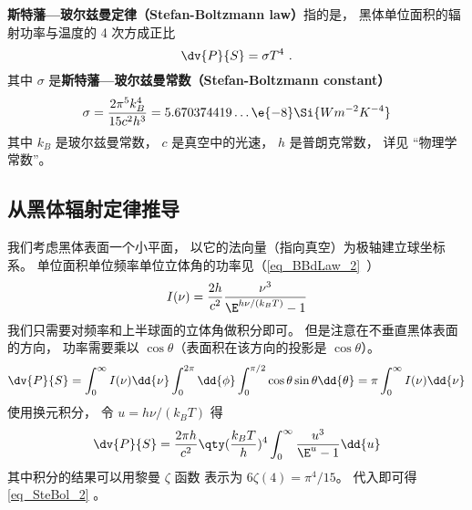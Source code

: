 
\textbf{斯特藩—玻尔兹曼定律（Stefan-Boltzmann law）}指的是， 黑体单位面积的辐射功率与温度的 4 次方成正比
\begin{equation}\label{eq_SteBol_2}
\dv{P}{S} = \sigma T^4~.
\end{equation}
其中 $\sigma$ 是\textbf{斯特藩—玻尔兹曼常数（Stefan-Boltzmann constant）}
\begin{equation}
\sigma = \frac{2\pi^5k_B^4}{15c^2h^3} = 5.670374419\dots \e{-8} \Si{Wm^{-2}K^{-4}}
\end{equation}
其中 $k_B$ 是玻尔兹曼常数， $c$ 是真空中的光速， $h$ 是普朗克常数， 详见 “物理学常数”。

\subsection{从黑体辐射定律推导}

我们考虑黑体表面一个小平面， 以它的法向量（指向真空）为极轴建立球坐标系。 单位面积单位频率单位立体角的功率见（\autoref{eq_BBdLaw_2}~）
\begin{equation}\label{eq_SteBol_1}
I(\nu) = \frac{2h}{c^2} \frac{\nu^3}{\E^{h\nu/(k_B T)} - 1}
\end{equation}
我们只需要对频率和上半球面的立体角做积分即可。 但是注意在不垂直黑体表面的方向， 功率需要乘以 $\cos\theta$（表面积在该方向的投影是 $\cos\theta$）。
\begin{equation}
\dv{P}{S} = \int_0^\infty I(\nu) \dd{\nu} \int_0^{2\pi} \dd{\phi} \int_0^{\pi/2}\cos\theta\sin\theta\dd{\theta}
= \pi \int_0^\infty I(\nu) \dd{\nu}
\end{equation}
使用换元积分， 令 $u = h\nu/(k_BT)$ 得
\begin{equation}
\dv{P}{S} = \frac{2\pi h}{c^2} \qty(\frac{k_B T}{h})^4 \int_0^\infty \frac{u^3}{\E^u - 1}\dd{u}
\end{equation}
其中积分的结果可以用黎曼 $\zeta$ 函数%
表示为 $6\zeta(4) = \pi^4/15$。 代入即可得\autoref{eq_SteBol_2} 。%
